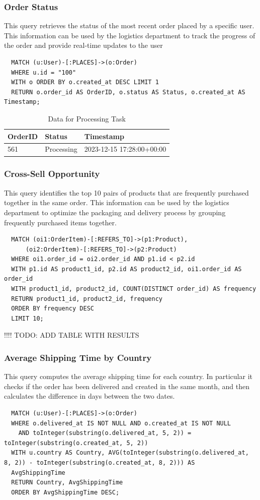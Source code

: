 \documentclass[a4paper,12pt]{article}
\begin{document}
\subsubsection{Order Status}
This query retrieves the status of the most recent order placed by a specific user. This information can be used by the logistics department to track the progress of the order and provide real-time updates to the user
\begin{verbatim}
  MATCH (u:User)-[:PLACES]->(o:Order)
  WHERE u.id = "100"
  WITH o ORDER BY o.created_at DESC LIMIT 1
  RETURN o.order_id AS OrderID, o.status AS Status, o.created_at AS Timestamp;
\end{verbatim}
\begin{table}[h!]
  \centering
  \caption{Data for Processing Task}
  \label{tab:processing_data}
  \begin{tabular}{l l l}
      \toprule
      \textbf{OrderID} & \textbf{Status} & \textbf{Timestamp} \\
      \midrule
      561 & Processing & 2023-12-15 17:28:00+00:00 \\
      \bottomrule
  \end{tabular}
\end{table}

\subsubsection{Cross-Sell Opportunity}
This query identifies the top 10 pairs of products that are frequently purchased together in the same order. This information can be used by the logistics department to optimize the packaging and delivery process by grouping frequently purchased items together.
\begin{verbatim}
  MATCH (oi1:OrderItem)-[:REFERS_TO]->(p1:Product),
      (oi2:OrderItem)-[:REFERS_TO]->(p2:Product)
  WHERE oi1.order_id = oi2.order_id AND p1.id < p2.id  
  WITH p1.id AS product1_id, p2.id AS product2_id, oi1.order_id AS order_id
  WITH product1_id, product2_id, COUNT(DISTINCT order_id) AS frequency
  RETURN product1_id, product2_id, frequency
  ORDER BY frequency DESC
  LIMIT 10;
\end{verbatim}

!!!! TODO: ADD TABLE WITH RESULTS

\subsubsection{Average Shipping Time by Country}
This query computes the average shipping time for each country.
In particular it checks if the order has been delivered and created in the same month, and then calculates the difference in days between the two dates.
\begin{verbatim}
  MATCH (u:User)-[:PLACES]->(o:Order)
  WHERE o.delivered_at IS NOT NULL AND o.created_at IS NOT NULL
    AND toInteger(substring(o.delivered_at, 5, 2)) = toInteger(substring(o.created_at, 5, 2))
  WITH u.country AS Country, AVG(toInteger(substring(o.delivered_at, 8, 2)) - toInteger(substring(o.created_at, 8, 2))) AS
  AvgShippingTime
  RETURN Country, AvgShippingTime
  ORDER BY AvgShippingTime DESC;
\end{verbatim}
\end{document}
